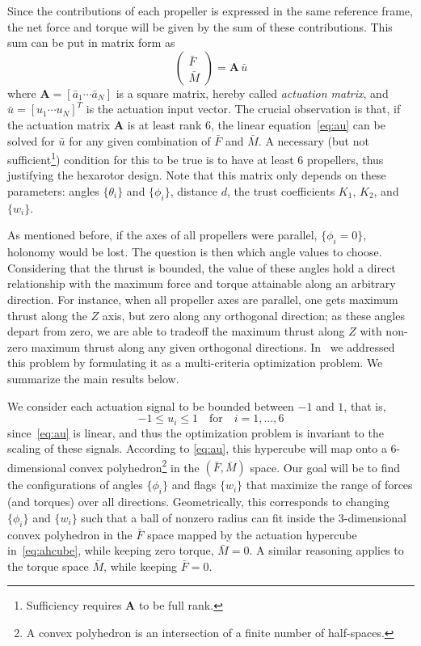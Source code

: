 \documentclass{article}
\begin{document}
Since the contributions of each propeller is expressed in the same
reference frame, the net force and torque will be given by the sum of
these contributions. This sum can be put in matrix form as
\begin{equation}
  \label{eq:au}
  \left(
    \begin{array}{c}
      \bar{F} \\
      \bar{M}
    \end{array}
  \right) = \mathbf{A}\,\bar{u}
\end{equation}
where $\mathbf{A}=[\bar{a}_1 \cdots \bar{a}_N]$ is a square matrix,
hereby called \emph{actuation matrix}, and $\bar{u}=[u_1\cdots u_N]^T$
is the actuation input vector. The crucial observation is that, if the
actuation matrix $\mathbf{A}$ is at least rank 6, the linear
equation~\eqref{eq:au} can be solved for $\bar{u}$ for any given
combination of $\bar{F}$ and $\bar{M}$.  A necessary (but not
sufficient\footnote{Sufficiency requires $\mathbf{A}$ to be full
  rank.}) condition for this to be true is to have at least 6
propellers, thus justifying the hexarotor design. Note that this
matrix only depends on these parameters: angles $\{\theta_i\}$ and
$\{\phi_i\}$, distance $d$, the trust coefficients $K_1$, $K_2$, and
$\{w_i\}$.

As mentioned before, if the axes of all propellers were parallel,
$\{\phi_i=0\}$, holonomy would be lost. The question is then which angle values to
choose. Considering that the thrust is
bounded, the value of these angles hold a direct relationship with the
maximum force and torque attainable along an arbitrary direction. For
instance, when all propeller axes are parallel, one gets maximum
thrust along the $Z$ axis, but zero along any orthogonal direction; as
these angles depart from zero, we are able to tradeoff the maximum
thrust along $Z$ with non-zero maximum thrust along any given orthogonal
directions. In~\cite{yoda:arxiv16a} we addressed this problem by formulating
it as a multi-criteria optimization problem. We summarize the main
results below.

We consider each actuation signal to be
bounded between $-1$ and $1$, that is,
\begin{equation}
  \label{eq:ahcube}
  -1 \leq u_i \leq 1 \quad \text{for} \quad i=1,\ldots,6
\end{equation}
since~\eqref{eq:au} is linear, and thus the optimization problem is
invariant to the scaling of these signals.  According to
\eqref{eq:au}, this hypercube will map onto a 6-dimensional convex
polyhedron\footnote{A convex polyhedron is an intersection of a finite
  number of half-spaces.} in the $(\bar{F}, \bar{M})$
space. Our goal will be to find the configurations of angles
$\{\phi_i\}$ and flags $\{w_i\}$ that maximize the range
of forces (and torques) over all directions.  Geometrically, this
corresponds to changing $\{\phi_i\}$ and $\{w_i\}$ such that a ball of
nonzero radius can fit inside the 3-dimensional convex polyhedron in
the $\bar{F}$ space mapped by the actuation hypercube
in~\eqref{eq:ahcube}, while keeping zero torque, $\bar{M}=0$. A
similar reasoning applies to the torque space $\bar{M}$, while keeping
$\bar{F}=0$.
\end{document}
